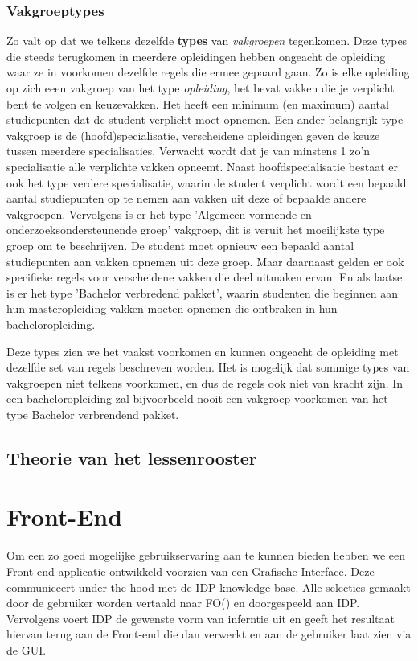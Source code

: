 \subsubsection{Vakgroeptypes}
Zo valt op dat we telkens dezelfde \textbf{types} van \emph{vakgroepen} tegenkomen. Deze types die steeds terugkomen in meerdere opleidingen hebben ongeacht de opleiding waar ze in voorkomen dezelfde regels die ermee gepaard gaan. Zo is elke opleiding op zich eeen vakgroep van het type \emph{opleiding}, het bevat vakken die je verplicht bent te volgen en keuzevakken. Het heeft een minimum (en maximum) aantal studiepunten dat de student verplicht moet opnemen. Een ander belangrijk type vakgroep is de (hoofd)specialisatie, verscheidene opleidingen geven de keuze tussen meerdere specialisaties. Verwacht wordt dat je van minstens 1 zo'n specialisatie alle verplichte vakken opneemt. Naast hoofdspecialisatie bestaat er ook het type verdere specialisatie, waarin de student verplicht wordt een bepaald aantal studiepunten op te nemen aan vakken uit deze of bepaalde andere vakgroepen. Vervolgens is er het type 'Algemeen vormende en onderzoeksondersteunende groep' vakgroep, dit is veruit het moeilijkste type groep om te beschrijven. De student moet opnieuw een bepaald aantal studiepunten aan vakken opnemen uit deze groep. Maar daarnaast gelden er ook specifieke regels voor verscheidene vakken die deel uitmaken ervan. En als laatse is er het type 'Bachelor verbredend pakket', waarin studenten die beginnen aan hun masteropleiding vakken moeten opnemen die ontbraken in hun bacheloropleiding.

Deze types zien we het vaakst voorkomen en kunnen ongeacht de opleiding met dezelfde set van regels beschreven worden. Het is mogelijk dat sommige types van vakgroepen niet telkens voorkomen, en dus de regels ook niet van kracht zijn. In een bacheloropleiding zal bijvoorbeeld nooit een vakgroep voorkomen van het type Bachelor verbrendend pakket. 

\subsection{Theorie van het lessenrooster}



\section{Front-End}

Om een zo goed mogelijke gebruikservaring aan te kunnen bieden hebben we een Front-end applicatie ontwikkeld voorzien van een Grafische Interface. Deze communiceert under the hood met de IDP knowledge base. Alle selecties gemaakt door de gebruiker worden vertaald naar FO(\textperiodcentered) en doorgespeeld aan IDP. Vervolgens voert IDP de gewenste vorm van inferntie uit en geeft het resultaat hiervan terug aan de Front-end die dan verwerkt en aan de gebruiker laat zien via de GUI.

